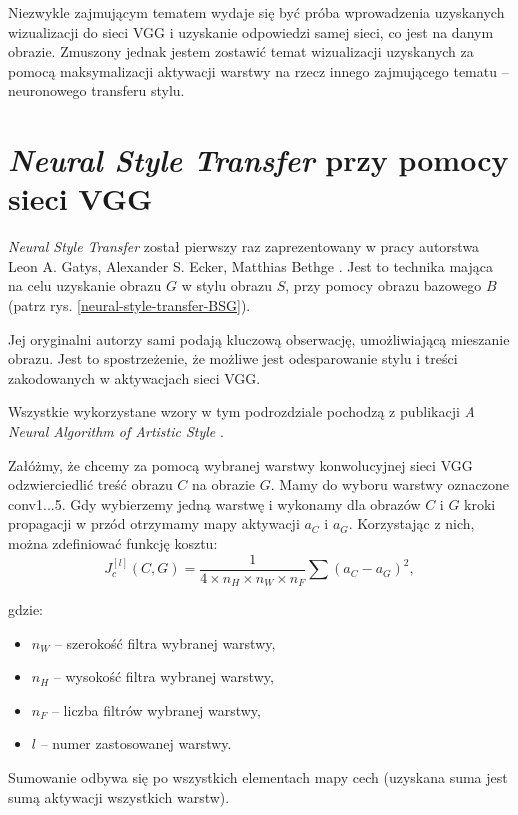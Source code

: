 Niezwykle zajmującym tematem wydaje się być próba wprowadzenia uzyskanych wizualizacji do sieci VGG i uzyskanie odpowiedzi samej sieci, co jest na danym obrazie. 
Zmuszony jednak jestem zostawić temat wizualizacji uzyskanych za pomocą maksymalizacji aktywacji warstwy na rzecz innego zajmującego tematu -- neuronowego transferu stylu.

\section{\textit{Neural Style Transfer} przy pomocy sieci VGG}
\label{vgg-nst}
\textit{Neural Style Transfer} został pierwszy raz zaprezentowany w pracy autorstwa Leon A. Gatys, Alexander S. Ecker, Matthias Bethge \cite{nstpaper}.
Jest to technika mająca na celu uzyskanie obrazu \(G\) w stylu obrazu \(S\), przy pomocy obrazu bazowego \(B\) (patrz rys. \ref{neural-style-transfer-BSG}).

Jej oryginalni autorzy sami podają kluczową obserwację, umożliwiającą mieszanie obrazu. Jest to spostrzeżenie, że możliwe jest odesparowanie stylu i treści zakodowanych w aktywacjach sieci VGG.

Wszystkie wykorzystane wzory w tym podrozdziale pochodzą z publikacji \textit{A Neural Algorithm of Artistic Style} \cite{nstpaper}.

Załóżmy, że chcemy za pomocą wybranej warstwy konwolucyjnej sieci VGG odzwierciedlić treść obrazu \(C\) na obrazie \(G\). Mamy do wyboru warstwy oznaczone conv1...5.
Gdy wybierzemy jedną warstwę i wykonamy dla obrazów \(C\) i \(G\) kroki propagacji w przód otrzymamy mapy aktywacji \(a_{C}\) i \(a_{G}\). Korzystając z nich, można zdefiniować
funkcję kosztu: \[J_{c}^{[l]}(C, G) = \frac{1}{4 \times n_H \times n_W \times n_F} \sum{(a_{C} - a_{G})^{2}}, \tag{11}\]

gdzie:

\begin{itemize}
\item
    \(n_{W}\) -- szerokość filtra wybranej warstwy,
\item
    \(n_{H}\) -- wysokość filtra wybranej warstwy,
\item
    \(n_{F}\) -- liczba filtrów wybranej warstwy,
\item
    \(l\) -- numer zastosowanej warstwy.
\end{itemize}

Sumowanie odbywa się po wszystkich elementach mapy cech (uzyskana suma jest sumą aktywacji wszystkich warstw). 

